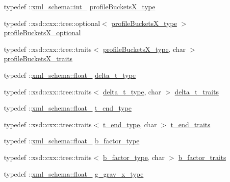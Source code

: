 \begin{DoxyCompactItemize}
\item 
typedef \+::\hyperlink{namespacexml__schema_acfa24ac68e1a188e7f44c36f7a158bf4}{xml\+\_\+schema\+::int\+\_\+} \hyperlink{classsetting__t_a424aba4ecbd3f03a202ef656303091a3}{profile\+Buckets\+X\+\_\+type}
\item 
typedef \+::xsd\+::cxx\+::tree\+::optional$<$ \hyperlink{classsetting__t_a424aba4ecbd3f03a202ef656303091a3}{profile\+Buckets\+X\+\_\+type} $>$ \hyperlink{classsetting__t_abe44e9ac5bfb035f396dc36d8a9831d6}{profile\+Buckets\+X\+\_\+optional}
\item 
typedef \+::xsd\+::cxx\+::tree\+::traits$<$ \hyperlink{classsetting__t_a424aba4ecbd3f03a202ef656303091a3}{profile\+Buckets\+X\+\_\+type}, char $>$ \hyperlink{classsetting__t_a2c2047f66bf736cf0d85fe515c715427}{profile\+Buckets\+X\+\_\+traits}
\item 
typedef \+::\hyperlink{namespacexml__schema_ad7e04ab17bba0b3fdde43fb79ef6ed87}{xml\+\_\+schema\+::float\+\_\+} \hyperlink{classsetting__t_ad2336c5ecdc0977272ba8126243d7977}{delta\+\_\+t\+\_\+type}
\item 
typedef \+::xsd\+::cxx\+::tree\+::traits$<$ \hyperlink{classsetting__t_ad2336c5ecdc0977272ba8126243d7977}{delta\+\_\+t\+\_\+type}, char $>$ \hyperlink{classsetting__t_a16a46f4b3724acbc577a9a89691709dd}{delta\+\_\+t\+\_\+traits}
\item 
typedef \+::\hyperlink{namespacexml__schema_ad7e04ab17bba0b3fdde43fb79ef6ed87}{xml\+\_\+schema\+::float\+\_\+} \hyperlink{classsetting__t_ab27962fdbca01941c3b6c632bc7ac360}{t\+\_\+end\+\_\+type}
\item 
typedef \+::xsd\+::cxx\+::tree\+::traits$<$ \hyperlink{classsetting__t_ab27962fdbca01941c3b6c632bc7ac360}{t\+\_\+end\+\_\+type}, char $>$ \hyperlink{classsetting__t_ab0900ed5312404537577df0234ed3239}{t\+\_\+end\+\_\+traits}
\item 
typedef \+::\hyperlink{namespacexml__schema_ad7e04ab17bba0b3fdde43fb79ef6ed87}{xml\+\_\+schema\+::float\+\_\+} \hyperlink{classsetting__t_afd5541e25ce3565005acb9c70bddda2d}{b\+\_\+factor\+\_\+type}
\item 
typedef \+::xsd\+::cxx\+::tree\+::traits$<$ \hyperlink{classsetting__t_afd5541e25ce3565005acb9c70bddda2d}{b\+\_\+factor\+\_\+type}, char $>$ \hyperlink{classsetting__t_a537558160cc066cde0fb14b74062cbf4}{b\+\_\+factor\+\_\+traits}
\item 
typedef \+::\hyperlink{namespacexml__schema_ad7e04ab17bba0b3fdde43fb79ef6ed87}{xml\+\_\+schema\+::float\+\_\+} \hyperlink{classsetting__t_af2a0b22be63f361de8ba6df7313b1a68}{g\+\_\+grav\+\_\+x\+\_\+type}

\end{DoxyCompactItemize}
